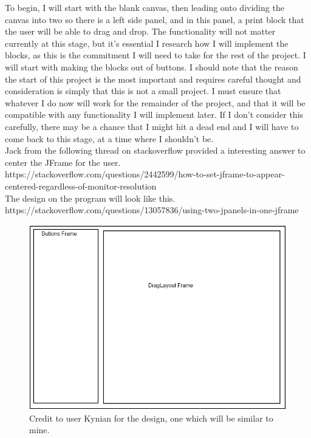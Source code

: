 \documentclass[a4paper, 12pt]{article}
\begin{document}
    To begin, I will start with the blank canvas, then leading onto dividing the canvas into two
    so there is a left side panel, and in this panel, a print block that the user will be able
    to drag and drop. The functionality will not matter currently at this stage, but it's
    essential I research how I will implement the blocks, as this is the commitment I will need
    to take for the rest of the project. I will start with making the blocks out of buttons.
    I should note that the reason the start of this project is the most important and requires
    careful thought and consideration is simply that this is not a small project. I must
    ensure that whatever I do now will work for the remainder of the project, and that it will
    be compatible with any functionality I will implement later. If I don't consider this
    carefully, there may be a chance that I might hit a dead end and I will have to come back
    to this stage, at a time where I shouldn't be. \\

    Jack from the following thread on stackoverflow provided a interesting answer to center
    the JFrame for the user.
    https://stackoverflow.com/questions/2442599/how-to-set-jframe-to-appear-centered-regardless-of-monitor-resolution \\

    The design on the program will look like this. https://stackoverflow.com/questions/13057836/using-two-jpanels-in-one-jframe

    \begin{figure}[h]
        \centering
        \includegraphics[width=150mm]{design.png}
        \caption{Credit to user Kynian for the design, one which will be similar to mine.}
    \end{figure}
\end{document}
